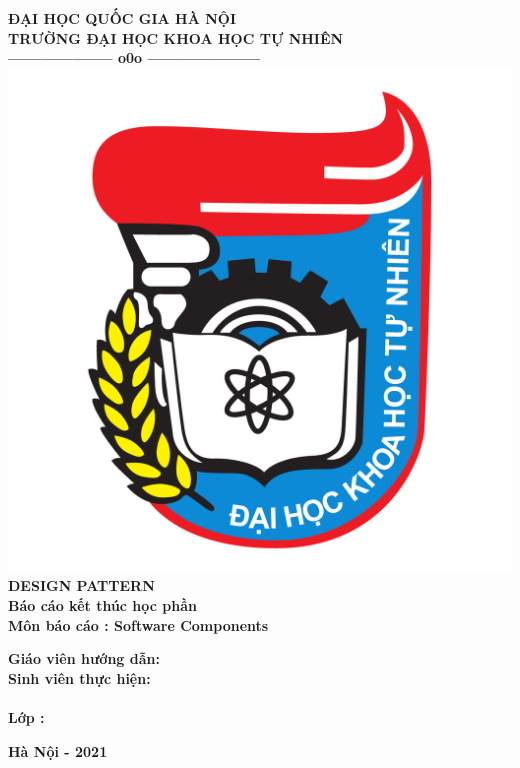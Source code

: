 \thispagestyle{empty}
\thisfancypage{
	\setlength{\fboxsep}{5pt}
	\shadowbox}{}

\begin{center}
	
	{\fontsize{13pt}{1}\selectfont\textbf{ĐẠI HỌC QUỐC GIA HÀ NỘI}}
	\\
	{\fontsize{13pt}{1}\selectfont\textbf{TRƯỜNG ĐẠI HỌC KHOA HỌC TỰ NHIÊN}}
	\\	
	\textbf{--------------------  o0o  ---------------------}\\[1cm]
	\includegraphics[scale=0.25]{GALLEYS/Logo-DH-Khoa-Hoc-Tu-Nhien-Ha-Noi-VNU-HUS.png} \\[1.2cm]
	\textbf{{\Huge DESIGN PATTERN}}
\textbf{}\\[1cm]
\textbf{{\large  Báo cáo kết thúc học phần}}\\[0.2cm]
\textbf{{\large Môn báo cáo : Software Components}}\\[1cm]
\end{center}
\begin{flushleft}
\hspace{1.5 cm} \textbf{ Giáo viên hướng dẫn:\hspace{0.4cm}{Quản Thái Hà}}\\[0.2cm]
\hspace{1.5 cm} \textbf{ Sinh viên thực hiện\hspace{0.3cm}:\hspace{0.2cm}{ Lê Quang Trường - 20001589}}\\[0.2cm]
\hspace{1.5 cm} \textbf{\hspace{4.9cm}{ Phan Thế Sơn - 20001579}}\\[0.2cm]
\hspace{1.7 cm} \textbf{Lớp\hspace{0.3 cm} \hspace{3.1cm}: \hspace{0.2 cm}{K65A7 Máy tính và Khoa học thông tin CLC }}
\end{flushleft}

\vspace{1.0cm}
\begin{center}
\textbf{{\large Hà Nội - 2021}}\\
\end{center}